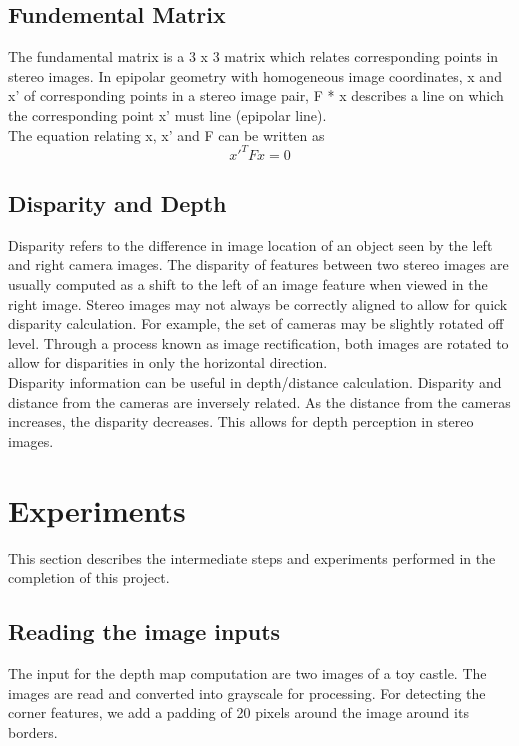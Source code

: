 \documentclass[letterpaper,11pt]{article}
\begin{document}
  
  \subsection{Fundemental Matrix}
  The fundamental matrix is a 3 x 3 matrix which relates corresponding points in stereo images. In epipolar geometry
  with homogeneous image coordinates, x and x' of corresponding points in a stereo image pair, F * x describes a line
  on which the corresponding point x' must line (epipolar line). \\
  The equation relating x, x' and F can be written as
\[
  x'^{T} F x = 0
  \]

  
\subsection{Disparity and Depth}
Disparity refers to the difference in image location of an object seen by the left and right camera images. The disparity of features between two stereo images are usually computed as a shift to the left of an image feature when viewed in the right image. Stereo images may not always be correctly aligned to allow for quick disparity calculation. For example, the set of cameras may be slightly rotated off level. Through a process known as image rectification, both images are rotated to allow for disparities in only the horizontal direction.\\
 Disparity information can be useful in depth/distance calculation. Disparity and distance from the cameras are inversely related. As the distance from the cameras increases, the disparity decreases. This allows for depth perception in stereo images. \\
  

\section{Experiments}
This section describes the intermediate steps and experiments
performed in the completion of this project.

\subsection{Reading the image inputs}

The input for the depth map computation are two images of a toy castle. The images are read and converted into grayscale for processing. For detecting the corner features, we add a padding of 20 pixels around the image around its borders. \\ 
\end{document}
